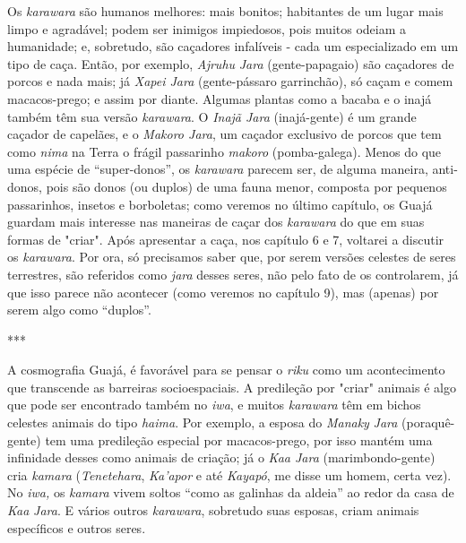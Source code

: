 Os \emph{karawara} são humanos melhores: mais bonitos; habitantes de um
lugar mais limpo e agradável; podem ser inimigos impiedosos, pois muitos
odeiam a humanidade; e, sobretudo, são caçadores infalíveis - cada um
especializado em um tipo de caça. Então, por exemplo, \emph{Ajruhu}
\emph{Jara} (gente-papagaio) são caçadores de porcos e nada mais; já
\emph{Xapei Jara} (gente-pássaro garrinchão), só caçam e comem
macacos-prego; e assim por diante. Algumas plantas como a bacaba e o
inajá também têm sua versão \emph{karawara}. O \emph{Inajã Jara}
(inajá-gente) é um grande caçador de capelães, e o \emph{Makoro Jara},
um caçador exclusivo de porcos que tem como \emph{nima} na Terra o
frágil passarinho \emph{makoro} (pomba-galega). Menos do que uma espécie
de ``super-donos'', os \emph{karawara} parecem ser, de alguma maneira,
anti-donos, pois são donos (ou duplos) de uma fauna menor, composta por
pequenos passarinhos, insetos e borboletas; como veremos no último
capítulo, os Guajá guardam mais interesse nas maneiras de caçar dos
\emph{karawara} do que em suas formas de "criar". Após apresentar a
caça, nos capítulo 6 e 7, voltarei a discutir os \emph{karawara}. Por
ora, só precisamos saber que, por serem versões celestes de seres
terrestres, são referidos como \emph{jara} desses seres, não pelo fato
de os controlarem, já que isso parece não acontecer (como veremos no
capítulo 9), mas (apenas) por serem algo como ``duplos''.

***

A cosmografia Guajá, é favorável para se pensar o \emph{riku} como um
acontecimento que transcende as barreiras socioespaciais. A predileção
por "criar" animais é algo que pode ser encontrado também no \emph{iwa},
e muitos \emph{karawara} têm em bichos celestes animais do tipo
\emph{haima}. Por exemplo, a esposa do \emph{Manaky} \emph{Jara}
(poraquê-gente) tem uma predileção especial por macacos-prego, por isso
mantém uma infinidade desses como animais de criação; já o \emph{Kaa
Jara} (marimbondo-gente) cria \emph{kamara} (\emph{Tenetehara},
\emph{Ka'apor} e até \emph{Kayapó}, me disse um homem, certa vez). No
\emph{iwa,} os \emph{kamara} vivem soltos ``como as galinhas da aldeia''
ao redor da casa de \emph{Kaa} \emph{Jara}. E vários outros
\emph{karawara}, sobretudo suas esposas, criam animais específicos e
outros seres.


